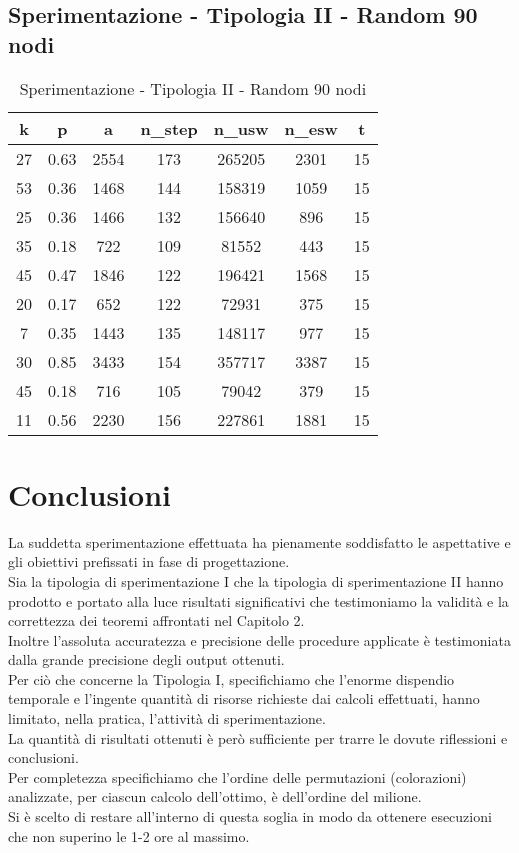 \subsection{Sperimentazione - Tipologia II - Random 90 nodi}

\begin{table}[H]
\centering
\begin{tabular}{|c|c|c|c|c|c|c|}
\hline
\textbf{k} & \textbf{p} & \textbf{a} & \textbf{n\_step} & \textbf{n\_usw} & \textbf{n\_esw} & \textbf{t} \\ \hline
27 & 0.63 & 2554 & 173 & 265205 & 2301 & 15 \\ \hline
53 & 0.36 & 1468 & 144 & 158319 & 1059 & 15 \\ \hline
25 & 0.36 & 1466 & 132 & 156640 & 896 & 15 \\ \hline
35 & 0.18 & 722 & 109 & 81552 & 443 & 15 \\ \hline
45 & 0.47 & 1846 & 122 & 196421 & 1568 & 15 \\ \hline
20 & 0.17 & 652 & 122 & 72931 & 375 & 15 \\ \hline
7 & 0.35 & 1443 & 135 & 148117 & 977 & 15 \\ \hline
30 & 0.85 & 3433 & 154 & 357717 & 3387 & 15 \\ \hline
45 & 0.18 & 716 & 105 & 79042 & 379 & 15 \\ \hline
11 & 0.56 & 2230 & 156 & 227861 & 1881 & 15 \\ \hline
\end{tabular}
\caption{Sperimentazione - Tipologia II - Random 90 nodi}
\label{tab:sperimentazione-tipo1-90nodi}
\end{table}

\section{Conclusioni}
\justify
La suddetta sperimentazione effettuata ha pienamente soddisfatto le aspettative e gli obiettivi prefissati in fase di progettazione.\\
Sia la tipologia di sperimentazione I che la tipologia di sperimentazione II hanno prodotto e portato alla luce risultati significativi che testimoniamo la validità e la correttezza dei teoremi affrontati nel Capitolo 2.\\
Inoltre l'assoluta accuratezza e precisione delle procedure applicate è testimoniata dalla grande precisione degli output ottenuti.\\

Per ciò che concerne la Tipologia I, specifichiamo che l'enorme dispendio temporale e l'ingente quantità di risorse richieste dai calcoli effettuati, hanno limitato, nella pratica, l'attività di sperimentazione.\\
La quantità di risultati ottenuti è però sufficiente per trarre le dovute riflessioni e conclusioni.\\
Per completezza specifichiamo che l'ordine delle permutazioni (colorazioni) analizzate, per ciascun calcolo dell'ottimo, è dell'ordine del milione.\\
Si è scelto di restare all'interno di questa soglia in modo da ottenere esecuzioni che non superino le 1-2 ore al massimo.\\

